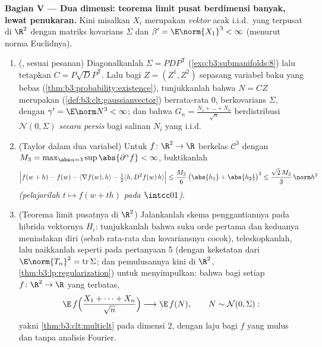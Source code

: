 \begin{problem}
\medskip
\noindent\textbf{Bagian V --- Dua dimensi: teorema limit pusat
berdimensi banyak, lewat penukaran.} Kini misalkan $X_i$ merupakan
\emph{vektor} acak i.i.d.\ yang terpusat di $\R^2$ dengan
matriks kovarians $\Sigma$ dan $\beta' = \E\norm{X_1}^3 <
\infty$ (menurut norma Euclidnya).
\begin{enumerate}[resume]
  \item (, sesuai pesanan) Diagonalkanlah $\Sigma =
        PDP^{\mathsf T}$ (\cref{exo:b3:submanifolds:8}) lalu
        tetapkan $C = P\sqrt DP^{\mathsf T}$. Lalu bagi $Z = (Z^1,
        Z^2)$ sepasang variabel  baku yang bebas
        (\cref{thm:b3:probability:existence}), tunjukkanlah bahwa $N
        = CZ$ merupakan 
        (\cref{def:b3:clt:gaussianvector}) berrata-rata $0$,
        berkovarians $\Sigma$, dengan $\gamma' = \E\norm N^3 <
        \infty$; dan bahwa $G_n = \frac{N_1 + \dots +
        N_n}{\sqrt n}$ berdistribusi $\mathcal N(0, \Sigma)$
        \emph{secara persis} bagi salinan $N_i$ yang i.i.d.
  \item (Taylor dalam dua variabel) Untuk $f \colon \R^2 \to
        \R$ berkelas $\mathcal C^3$ dengan $M_3 =
        \max_{\abs\alpha = 3}\sup\abs{\partial^\alpha f} <
        \infty$, buktikanlah
        \[
        \Bigl|f(w + h) - f(w) - \langle\nabla f(w),
        h\rangle - \tfrac12\langle h, D^2f(w)\,h\rangle
        \Bigr| \leq \frac{M_3}6\,\bigl(\abs{h_1} +
        \abs{h_2}\bigr)^3 \leq \frac{\sqrt2\,M_3}3\,
        \norm h^3
        \]
        \emph{(pelajarilah $t \mapsto f(w + th)$ pada
        $\intcc01$)}.
  \item (Teorema limit pusatnya di $\R^2$) Jalankanlah skema penggantiannya pada
        hibrida vektornya $H_i$: tunjukkanlah bahwa suku orde pertama dan
        keduanya meniadakan diri (sebab rata-rata dan kovariansnya cocok), teleskopkanlah,
        lalu naikkanlah seperti pada pertanyaan 5
        (dengan keketatan dari $\E\norm{T_n}^2 =
        \operatorname{tr}\Sigma$; dan pemulusannya kini di
        $\R^2$, \cref{thm:b3:lp:regularization}) untuk
        menyimpulkan: bahwa bagi setiap $f \colon
        \R^2 \to \R$ yang  terbatas,
        \[
        \E\,f\Bigl(\frac{X_1 + \dots + X_n}{\sqrt n}\Bigr)
        \longrightarrow \E\,f(N), \qquad N \sim \mathcal
        N(0, \Sigma) :
        \]
        yakni \cref{thm:b3:clt:multiclt} pada dimensi $2$, dengan
        laju bagi $f$ yang mulus dan tanpa analisis Fourier.

\end{enumerate}
\end{problem}
